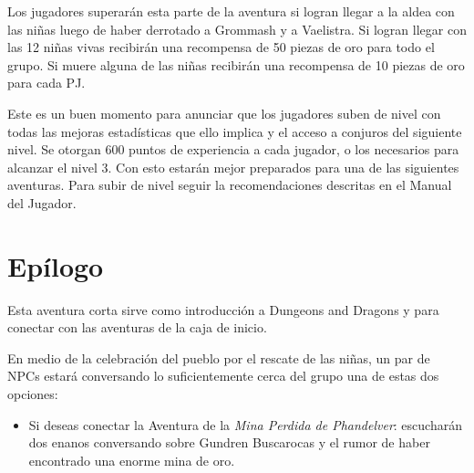 \documentclass[10pt,twoside,twocolumn,openany]{dndbook}
\begin{document}
Los jugadores superarán esta parte de la aventura si logran llegar a la aldea con las niñas 
luego de haber derrotado a Grommash y a Vaelistra. Si logran llegar con las 12 niñas vivas 
recibirán una recompensa de 50 piezas de oro para todo el grupo. Si muere alguna de las niñas 
recibirán una recompensa de 10 piezas de oro para cada PJ.

Este es un buen momento para anunciar que los jugadores suben de nivel con todas las mejoras 
estadísticas que ello implica y el acceso a conjuros del siguiente nivel. Se otorgan 600 puntos 
de experiencia a cada jugador, o los necesarios para alcanzar el nivel 3. Con esto estarán mejor 
preparados para una de las siguientes aventuras. Para subir de nivel seguir la recomendaciones
descritas en el Manual del Jugador.

\section{Epílogo}

Esta aventura corta sirve como introducción a Dungeons and Dragons y para conectar con las 
aventuras de la caja de inicio.

En medio de la celebración del pueblo por el rescate de las niñas, un par de NPCs estará conversando
lo suficientemente cerca del grupo una de estas dos opciones:

\begin{itemize}
  \item Si deseas conectar la Aventura de la \emph{Mina Perdida de Phandelver}: escucharán dos 
  enanos conversando sobre Gundren Buscarocas y el rumor de haber encontrado una enorme mina de 
  oro.
\end{itemize}
\end{document}
